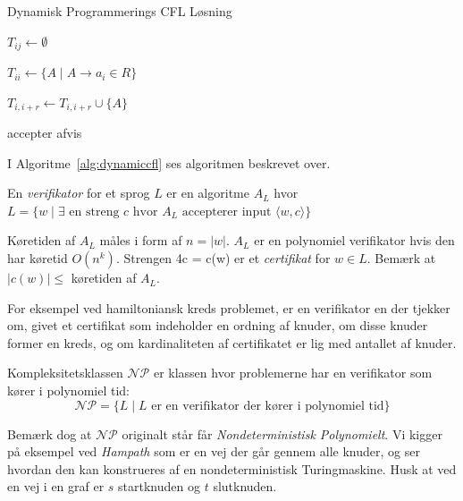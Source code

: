 \begin{algorithm}
	\caption{\label{alg:dynamiccfl}Dynamisk Programmerings CFL Løsning}
	\begin{algorithmic}[1]
		\STATE $T_{ij} \gets \emptyset$
		\ENDFOR
		\ENDFOR

		\STATE $T_{ii} \gets \{ A \mid A \to a_i \in R \}$
		\ENDFOR

		\STATE $T_{i,i+r} \gets T_{i,i+r} \cup \{ A \}$
		\ENDIF
		\ENDFOR
		\ENDFOR
		\ENDFOR
		\ENDFOR

		\STATE accepter
		\ELSE
		\STATE afvis
		\ENDIF
	\end{algorithmic}
\end{algorithm}

I Algoritme~\ref{alg:dynamiccfl} ses algoritmen beskrevet over.

\begin{definition}
	En \textit{verifikator} for et sprog $L$ er en algoritme $A_{L}$ hvor \\$L = \{w \mid \exists \text{ en streng } c \text{ hvor } A_{L} \text{ accepterer input } \langle w, c \rangle \}$
\end{definition}

Køretiden af $A_{L}$ måles i form af $n = |w|$. $A_{L}$ er en polynomiel verifikator hvis den har køretid $O(n^{k})$. Strengen 4c = c(w) er et \textit{certifikat} for $w \in L$. Bemærk at $|c(w)| \le $ køretiden af $A_{L}$.

For eksempel ved hamiltoniansk kreds problemet, er en verifikator en der tjekker om, givet et certifikat som indeholder en ordning af knuder, om disse knuder former en kreds, og om kardinaliteten af certifikatet er lig med antallet af knuder.

\begin{definition}
	Kompleksitetsklassen $\mathcal{NP}$ er klassen hvor problemerne har en verifikator som kører i polynomiel tid:
	\begin{equation}
		\mathcal{NP} = \{ L \mid L \text{ er en verifikator der kører i polynomiel tid}\}
	\end{equation}
\end{definition}

Bemærk dog at $\mathcal{NP}$ originalt står får \textit{Nondeterministisk Polynomielt}. Vi kigger på eksempel ved \textit{Hampath} som er en vej der går gennem alle knuder, og ser hvordan den kan konstrueres af en nondeterministisk Turingmaskine. Husk at ved en vej i en graf er $s$ startknuden og $t$ slutknuden.

